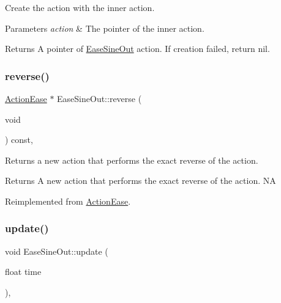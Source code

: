 Create the action with the inner action. 


\begin{DoxyParams}{Parameters}
{\em action} & The pointer of the inner action. \\
\hline
\end{DoxyParams}
\begin{DoxyReturn}{Returns}
A pointer of \hyperlink{classEaseSineOut}{Ease\+Sine\+Out} action. If creation failed, return nil. 
\end{DoxyReturn}
\mbox{\label{classEaseSineOut_a7fb6a1800ff40fa9cc4fc1ccf90f2540}} 
\subsubsection{\texorpdfstring{reverse()}{reverse()}}
{\footnotesize\ttfamily \hyperlink{classActionEase}{Action\+Ease} $\ast$ Ease\+Sine\+Out\+::reverse (\begin{DoxyParamCaption}\item[{void}]{ }\end{DoxyParamCaption}) const\hspace{0.3cm}{\ttfamily [override]}, {\ttfamily [virtual]}}

Returns a new action that performs the exact reverse of the action.

\begin{DoxyReturn}{Returns}
A new action that performs the exact reverse of the action.  NA 
\end{DoxyReturn}


Reimplemented from \hyperlink{classActionEase_ab99eb083fa033fae1d6c948fdc730782}{Action\+Ease}.

\mbox{\label{classEaseSineOut_ab22bfc099303b7e48a1f8c308a930e66}} 
\subsubsection{\texorpdfstring{update()}{update()}}
{\footnotesize\ttfamily void Ease\+Sine\+Out\+::update (\begin{DoxyParamCaption}\item[{float}]{time }\end{DoxyParamCaption})\hspace{0.3cm}{\ttfamily [override]}, {\ttfamily [virtual]}}

